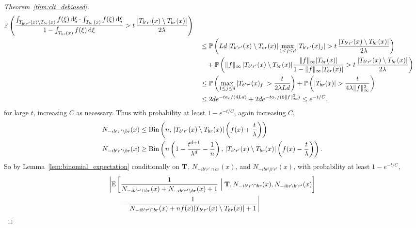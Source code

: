 \begin{proof}[Theorem~\ref{thm:clt_debiased}]
\begin{align*}
    \mathbb{P} \left(
      \frac{\int_{T_{b' r'}(x) \setminus T_{b r}(x)} f(\xi) \,\mathrm{d}\xi
      \cdot \int_{T_{b r}(x)} f(\xi) \,\mathrm{d}\xi}
      {1 - \int_{T_{b r}(x)} f(\xi) \,\mathrm{d}\xi}
      > t \, \frac{|T_{b' r'}(x) \setminus T_{b r}(x)|}{2\lambda}
    \right) \\
    &\quad\leq
    \mathbb{P} \left(
      L d\,
      |T_{b' r'}(x) \setminus T_{b r}(x)|
      \max_{1 \leq j \leq d} |T_{b' r'}(x)_j|
      > t \, \frac{|T_{b' r'}(x) \setminus T_{b r}(x)|}{2\lambda}
    \right) \\
    &\qquad+
    \mathbb{P} \left(
      \|f\|_\infty
      \,|T_{b' r'}(x) \setminus T_{b r}(x)|
      \frac{\|f\|_\infty |T_{b r}(x)|}
      {1 - \|f\|_\infty |T_{b r}(x)|}
      > t \, \frac{|T_{b' r'}(x) \setminus T_{b r}(x)|}{2\lambda}
    \right) \\
    &\quad\leq
    \mathbb{P} \left(
      \max_{1 \leq j \leq d} |T_{b' r'}(x)_j|
      >  \frac{t}{2\lambda L d}
    \right)
    +\mathbb{P} \left(
      |T_{b r}(x)|
      > \frac{t}{4\lambda \|f\|_\infty^2}
    \right) \\
    &\quad\leq
    2 d e^{-t a_r /(4L d)}
    + 2 d e^{-t a_r / (8 \|f\|_\infty^2)}
    \leq e^{-t/C},
  \end{align*}
  for large $t$,
  increasing $C$ as necessary.
  Thus with probability at least $1 - e^{-t/C}$,
  again increasing $C$,
  \begin{align*}
    N_{-i b' r' \setminus b r}(x)
    &\leq \operatorname{Bin}\left(
      n, \,
      |T_{b' r'}(x) \setminus T_{b r}(x)|
      \left( f(x) + \frac{t}{\lambda} \right)
    \right) \\
    N_{-i b' r' \setminus b r}(x)
    &\geq
    \operatorname{Bin}\left(
      n
      \left( 1 - \frac{t^{d+1}}{\lambda^d}
      - \frac{1}{n} \right), \,
      |T_{b' r'}(x) \setminus T_{b r}(x)|
      \left( f(x) - \frac{t}{\lambda} \right)
    \right).
  \end{align*}
  So by Lemma~\ref{lem:binomial_expectation} conditionally on
  $\mathbf{T}$, $N_{-i b' r' \cap b r}(x)$, and $N_{-i b r \setminus b' r'}(x)$,
  with probability at least $1 - e^{-t/C}$,
  \begin{align*}
    &\left|
    \E \left[
      \frac{1}
      {N_{-i b' r' \cap b r}(x)+N_{-i b' r' \setminus b r}(x)+1}
      \Bigm| \bT, N_{-i b' r' \cap b r}(x), N_{-i b r \setminus b' r'}(x)
    \right]
    \right.
    \\
    &\left.
    \qquad-
    \frac{1}
    {N_{-i b' r' \cap b r}(x) + n f(x) |T_{b' r'}(x) \setminus T_{b r}(x)|+1}
    \right| \\

\end{align*}
\end{proof}
